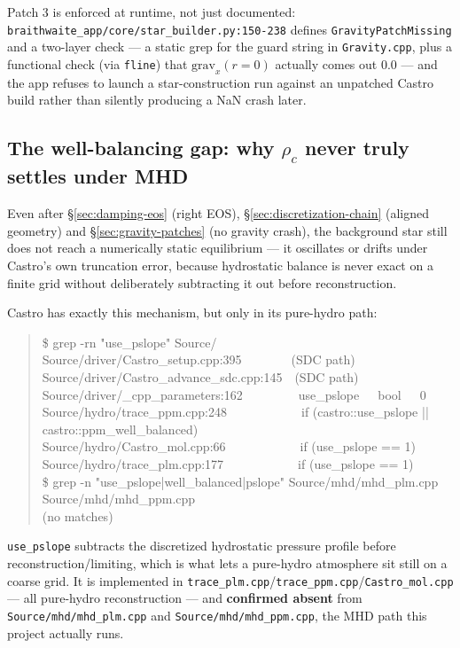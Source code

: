 \documentclass[11pt,a4paper]{scrartcl}
\newcommand{\code}[1]{\texttt{\small #1}}
\begin{document}
Patch 3 is enforced at runtime, not just documented:
\code{braithwaite\_app/core/star\_builder.py:150-238} defines
\code{GravityPatchMissing} and a two-layer check --- a static grep for
the guard string in \code{Gravity.cpp}, plus a functional check (via
\code{fline}) that $\text{grav}_x(r{=}0)$ actually comes out $0.0$ ---
and the app refuses to launch a star-construction run against an
unpatched Castro build rather than silently producing a NaN crash
later.

\subsection{The well-balancing gap: why \texorpdfstring{$\rho_c$}{rho\_c} never truly settles under MHD}
\label{sec:wellbalancing}

Even after \S\ref{sec:damping-eos} (right EOS),
\S\ref{sec:discretization-chain} (aligned geometry) and
\S\ref{sec:gravity-patches} (no gravity crash), the background star
still does not reach a numerically static equilibrium --- it oscillates
or drifts under Castro's own truncation error, because hydrostatic
balance is never exact on a finite grid without deliberately
subtracting it out before reconstruction.

Castro has exactly this mechanism, but only in its pure-hydro path:
\begin{quote}\ttfamily\small
\$ grep -rn "use\_pslope" Source/\\
Source/driver/Castro\_setup.cpp:395~~~~~~~~(SDC path)\\
Source/driver/Castro\_advance\_sdc.cpp:145~~(SDC path)\\
Source/driver/\_cpp\_parameters:162~~~~~~~~~use\_pslope~~~bool~~~0\\
Source/hydro/trace\_ppm.cpp:248~~~~~~~~~~~~if (castro::use\_pslope || castro::ppm\_well\_balanced)\\
Source/hydro/Castro\_mol.cpp:66~~~~~~~~~~~~if (use\_pslope == 1)\\
Source/hydro/trace\_plm.cpp:177~~~~~~~~~~~~if (use\_pslope == 1)\\[4pt]
\$ grep -n "use\_pslope|well\_balanced|pslope" Source/mhd/mhd\_plm.cpp Source/mhd/mhd\_ppm.cpp\\
(no matches)
\end{quote}

\code{use\_pslope} subtracts the discretized hydrostatic pressure
profile before reconstruction/limiting, which is what lets a pure-hydro
atmosphere sit still on a coarse grid. It is implemented in
\code{trace\_plm.cpp}/\code{trace\_ppm.cpp}/\code{Castro\_mol.cpp} ---
all pure-hydro reconstruction --- and \textbf{confirmed absent} from
\code{Source/mhd/mhd\_plm.cpp} and \code{Source/mhd/mhd\_ppm.cpp}, the
MHD path this project actually runs.
\end{document}
